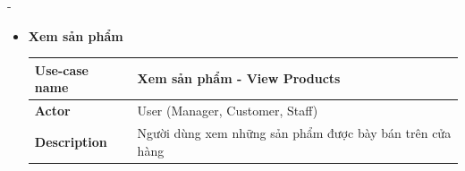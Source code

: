 \begin {list} {-}{}
\begin{itemize}
\begin{table}[H]
\begin{tabular}{|l|l|}
        \end{tabular}
        \begin{center}
        \end{center}
        \caption{Đặc tả use case đăng ký tài khoản}
        \label{table:signup}
    \end{table}
    \newpage
    \item \textbf{Xem sản phẩm}
    \begin{table}[H]
        \begin{tabular}{|l|l|}
        \hline
        \textbf{Use-case name}    & \textbf{Xem sản phẩm - View Products}                                                                                                                                                                                                                                                                                                                                                                                                                                                                                                                                                                                                                                                                                                                                                                           \\ \hline
        \textbf{Actor}            & User (Manager, Customer, Staff)                                                                                                                                                                                                                                                                                                                                                                                                                                                                                                                                                                                                                                                                                                                                                                                 \\ \hline
        \textbf{Description}      & Người dùng xem những sản phẩm được bày bán trên cửa hàng                                                                                                                                                                                                                                                                                                                                                                                                                                                                                                                                                                                                                                                                                                                                                        \\ \hline

\end{tabular}
\end{table}
\end{itemize}
\end{list}
